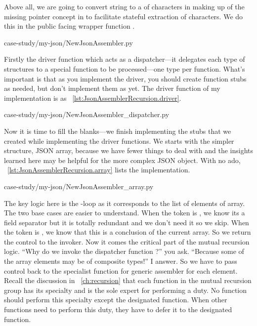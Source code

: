Above all, we are going to convert string to a  of characters in making up of the
missing pointer concept in \python to facilitate stateful extraction of characters.
We do this in the public facing wrapper function .
\begin{table}[H]

{case-study/my-json/NewJsonAssembler.py}
\end{table}

Firstly the driver function which acts as a dispatcher---it delegates each type
of structures to a special function to be processed---one type per function.
What's important is that as you implement the driver, you should create function stubs as
needed, but don't implement them as yet.
The driver function of my implementation is as ~\autoref{lst:JsonAssemblerRecursion.driver}.

\begin{table}[H]

{case-study/my-json/NewJsonAssembler_dispatcher.py}
\end{table}

Now it is time to fill the blanks---we finish implementing the stubs that we created
while implementing the driver functions.
We starts with the simpler structure, JSON array, because we have fewer things to deal with and the
insights learned here may be helpful for the more complex JSON object.
With no ado, ~\autoref{lst:JsonAssemblerRecursion.array} lists the implementation.

\begin{table}[H]

{case-study/my-json/NewJsonAssembler_array.py}
\end{table}

The key logic here is the -loop as it corresponds to the list of elements of array.
The two base cases are easier to understand.
When the token is , we know its a field separator but it is totally redundant and we
don't need it so we skip.
When the token is \code{']'}, we know that this is a conclusion of the current array.
So we return the control to the invoker.
Now it comes the critical part of the mutual recursion logic.
``Why do we invoke the dispatcher function ?'' you ask.
``Because some of the array elements may be of composite types!'' I answer.
So we have to pass control back to the specialist function for generic assembler for each element.
Recall the discussion in ~\autoref{ch:recursion} that each function in the mutual recursion group
has its specialty and is the sole expert for performing a duty.
No function should perform this specialty except the designated function.
When other functions need to perform this duty, they have to defer it to the designated function.

